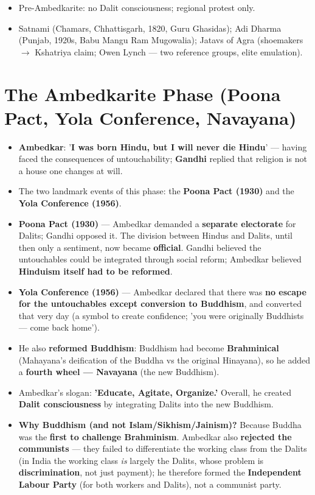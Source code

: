 \begin{QuickRevision}
\begin{itemize}
\item Pre-Ambedkarite: no Dalit consciousness; regional protest only.
\item Satnami (Chamars, Chhattisgarh, 1820, Guru Ghasidas); Adi Dharma (Punjab, 1920s, Babu Mangu Ram Mugowalia); Jatavs of Agra (shoemakers $\rightarrow$ Kshatriya claim; Owen Lynch --- two reference groups, elite emulation).
\end{itemize}
\end{QuickRevision}

\section{The Ambedkarite Phase (Poona Pact, Yola Conference, Navayana)}

\begin{KeyConcept}
\begin{itemize}
\item \textbf{Ambedkar}: '\textbf{I was born Hindu, but I will never die Hindu}' --- having faced the consequences of untouchability; \textbf{Gandhi} replied that religion is not a house one changes at will.
\item The two landmark events of this phase: the \textbf{Poona Pact (1930)} and the \textbf{Yola Conference (1956)}.
\item \textbf{Poona Pact (1930)} --- Ambedkar demanded a \textbf{separate electorate} for Dalits; Gandhi opposed it. The division between Hindus and Dalits, until then only a sentiment, now became \textbf{official}. Gandhi believed the untouchables could be integrated through social reform; Ambedkar believed \textbf{Hinduism itself had to be reformed}.
\item \textbf{Yola Conference (1956)} --- Ambedkar declared that there was \textbf{no escape for the untouchables except conversion to Buddhism}, and converted that very day (a symbol to create confidence; 'you were originally Buddhists --- come back home').
\item He also \textbf{reformed Buddhism}: Buddhism had become \textbf{Brahminical} (Mahayana's deification of the Buddha vs the original Hinayana), so he added a \textbf{fourth wheel --- Navayana} (the new Buddhism).
\item Ambedkar's slogan: \textbf{'Educate, Agitate, Organize.'} Overall, he created \textbf{Dalit consciousness} by integrating Dalits into the new Buddhism.
\item \textbf{Why Buddhism (and not Islam/Sikhism/Jainism)?} Because Buddha was the \textbf{first to challenge Brahminism}. Ambedkar also \textbf{rejected the communists} --- they failed to differentiate the working class from the Dalits (in India the working class \emph{is} largely the Dalits, whose problem is \textbf{discrimination}, not just payment); he therefore formed the \textbf{Independent Labour Party} (for both workers and Dalits), not a communist party.
\end{itemize}
\end{KeyConcept}

